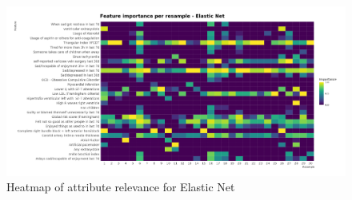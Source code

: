 \begin{figure}[H]
    \caption{Heatmap of attribute relevance for Elastic Net}
    \centerline{\includegraphics[scale=.21]{../reports/results/models_and_evals/summary/var_imp_resample_glmnet.png}}
    \label{fig:heatmap-glmnet}
\end{figure}

